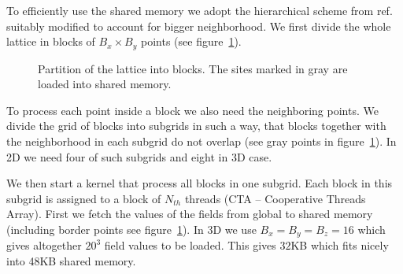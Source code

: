 \documentclass[a4paper]{llncs}
\newcommand{\fillblockgray}[2]{
\pgfmathtruncatemacro\llx{\bksize*(#1)-2}
\pgfmathtruncatemacro\lly{\bksize*(#2)-2}
\pgfmathtruncatemacro\urx{\bksize*(#1+1)+1}
\pgfmathtruncatemacro\ury{\bksize*(#2+1)+1}
\foreach \x in {\llx, ..., \urx}
  \foreach \y in {\lly,...,\ury} {
    \fill[gray] (\x, \y) circle(.25);
  }
}
\newcommand{\npartition}[3]{
\pgfmathtruncatemacro\row{Mod(#2,4)}
\ifnum \row = 0
   \pgfmathtruncatemacro\num{Mod(#1,4)}
\else \ifnum \row  = 1
   \pgfmathtruncatemacro\num{Mod(#1,4)+4}
\else \ifnum \row  = 2
   \pgfmathtruncatemacro\num{Mod(Mod(#1,4)+2,4)}
\else \ifnum \row  = 3
   \pgfmathtruncatemacro\num{Mod(Mod(#1,4)+2,4)+4}
\fi
\fi
\fi
\fi
\ifnum \num = #3
\draw[draw=black,fill=red] (#1, #2) circle(0.4);
\fi

}
\newcommand{\markpartition}[3]{
\pgfmathtruncatemacro\llx{\bksize*(#1)}
\pgfmathtruncatemacro\lly{\bksize*(#2)}
\pgfmathtruncatemacro\urx{\bksize*(#1+1)-1}
\pgfmathtruncatemacro\ury{\bksize*(#2+1)-1}
\foreach \x in {\llx, ..., \urx}
  \foreach \y in {\lly,...,\ury} {
    \npartition{\x}{\y}{#3}
  }
}
\def\bksize{8}
\def\bkcount{4}
\def\lcsize{5}
\begin{document}
To efficiently use the shared memory  we adopt the hierarchical scheme from
ref.~\cite{weigel} suitably modified to account for bigger
neighborhood.  We first divide the whole lattice in blocks of
$B_x\times B_y$ points (see figure~\ref{fig:blocks}). 
\begin{figure} 
\begin{center}

\end{center}
\caption{\label{fig:blocks}Partition of the lattice into
  blocks.  The sites 
marked in gray are loaded into shared memory.}
\end{figure}
To process each point inside a block we also need the neighboring
points.  We divide the grid of blocks into subgrids in such a way,
that blocks together with the neighborhood in each subgrid do not
overlap (see gray points in figure~\ref{fig:blocks}). In 2D we need
four of such subgrids and eight in 3D case.

We then start a kernel that process all blocks in one subgrid.  Each
block in this subgrid is assigned to a block of $N_{th}$ threads (CTA
-- Cooperative Threads Array). First we fetch the values of the fields
from global to shared memory (including border points see
figure~\ref{fig:blocks}).  In 3D we use $B_x=B_y=B_z=16$ which gives
altogether $20^3$ field values to be loaded. This gives $32$KB which
fits nicely into 48KB shared memory.
\end{document}
